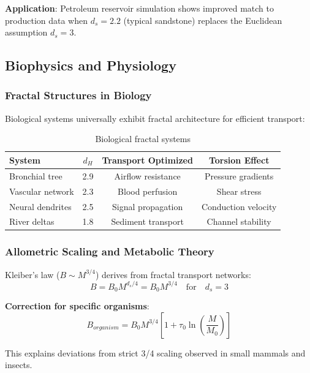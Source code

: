 \textbf{Application}: Petroleum reservoir simulation shows improved match to production data when $d_s = 2.2$ (typical sandstone) replaces the Euclidean assumption $d_s = 3$.

\subsection{Biophysics and Physiology}

\subsubsection{Fractal Structures in Biology}

Biological systems universally exhibit fractal architecture for efficient transport:

\begin{table}[h]
\centering
\begin{tabular}{lccc}
\toprule
\textbf{System} & \textbf{$d_H$} & \textbf{Transport Optimized} & \textbf{Torsion Effect} \\
\midrule
Bronchial tree & 2.9 & Airflow resistance & Pressure gradients \\
Vascular network & 2.3 & Blood perfusion & Shear stress \\
Neural dendrites & 2.5 & Signal propagation & Conduction velocity \\
River deltas & 1.8 & Sediment transport & Channel stability \\
\bottomrule
\end{tabular}
\caption{Biological fractal systems}
\end{table}

\subsubsection{Allometric Scaling and Metabolic Theory}

Kleiber's law ($B \sim M^{3/4}$) derives from fractal transport networks:
\begin{equation}
    B = B_0 M^{d_s/4} = B_0 M^{3/4} \quad \text{for} \quad d_s = 3
\end{equation}

\textbf{Correction for specific organisms}: 
\begin{equation}
    B_{organism} = B_0 M^{3/4} \left[1 + \tau_0 \ln\left(\frac{M}{M_0}\right)\right]
\end{equation}

This explains deviations from strict 3/4 scaling observed in small mammals and insects.

